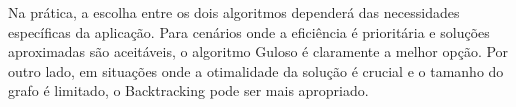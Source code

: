\documentclass[12pt]{article}
\begin{document}
Na prática, a escolha entre os dois algoritmos dependerá das necessidades específicas da aplicação. Para cenários onde a eficiência é prioritária e soluções aproximadas são aceitáveis, o algoritmo Guloso é claramente a melhor opção. Por outro lado, em situações onde a otimalidade da solução é crucial e o tamanho do grafo é limitado, o Backtracking pode ser mais apropriado.

\vspace{1cm}

  
\end{document}
